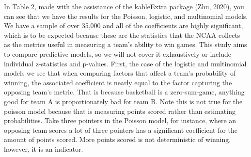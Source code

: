 \documentclass[
  english,
  man,floatsintext]{apa6}
\begin{document}
In Table 2, made with the assistance of the kableExtra package (Zhu, 2020), you can see that we have the results for the Poisson, logistic, and multinomial models. We have a sample of over 35,000 and all of the coefficients are highly significant, which is to be expected because these are the statistics that the NCAA collects as the metrics useful in measuring a team's ability to win games. This study aims to compare predictive models, so we will not cover it exhaustively or include individual z-statistics and p-values. First, the case of the logistic and multinomial models we see that when comparing factors that affect a team's probability of winning, the associated coefficient is nearly equal to the factor capturing the opposing team's metric. That is because basketball is a zero-sum-game, anything good for team A is proportionately bad for team B. Note this is not true for the poisson model because that is measuring points scored rather than estimating probabilities. Take three pointers in the Poisson model, for instance, where an opposing team scores a lot of three pointers has a significant coefficient for the amount of points scored. More points scored is not deterministic of winning, however, it is an indicator.
\end{document}
